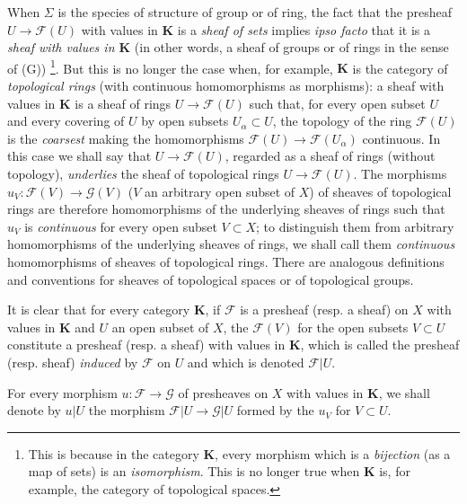 \begin{env}[3.1.4]
\label{0.3.1.4}
When $\Sigma$ is the species of structure of group or of ring, the fact that
the presheaf $U\to\mathcal{F}(U)$ with values in $\mathbf{K}$ is a
\emph{sheaf of sets} implies \emph{ipso facto} that it is a
\emph{sheaf with values in $\mathbf{K}$} (in other words, a sheaf of
groups or of rings in the sense of (G))%
\footnote{This is because in the category $\mathbf{K}$, every morphism
which is a \emph{bijection} (as a map of sets) is an
\emph{isomorphism}. This is no longer true when $\mathbf{K}$ is, for example, the
category of topological spaces.}. But this is no longer the
case when, for example, $\mathbf{K}$ is the category of \emph{topological
rings} (with continuous homomorphisms as morphisms): a
sheaf with values in $\mathbf{K}$ is a sheaf of rings
$U\to\mathcal{F}(U)$ such that, for every open subset $U$ and every covering of $U$
by open subsets $U_\alpha\subset U$, the topology of the ring $\mathcal{F}(U)$
is the \emph{coarsest} making the homomorphisms
$\mathcal{F}(U)\to\mathcal{F}(U_\alpha)$ continuous. In this case we shall say that
$U\to\mathcal{F}(U)$, regarded as a sheaf of rings (without topology),
\emph{underlies} the sheaf of topological rings
$U\to\mathcal{F}(U)$. The morphisms
$u_V:\mathcal{F}(V)\to\mathcal{G}(V)$ ($V$ an arbitrary open subset of $X$) of
sheaves of topological rings are therefore homomorphisms of the underlying sheaves
of rings such that $u_V$ is \emph{continuous} for every open subset
$V\subset X$; to distinguish them from arbitrary homomorphisms of the
underlying sheaves of rings, we shall call them \emph{continuous}
homomorphisms of sheaves of topological rings. There are analogous definitions and
conventions for sheaves of topological spaces or of topological
groups.
\end{env}


\begin{env}[3.1.5]
\label{0.3.1.5}
It is clear that for every category $\mathbf{K}$, if $\mathcal{F}$ is a
presheaf (resp. a sheaf) on $X$ with values in $\mathbf{K}$ and $U$ an
open subset of $X$, the $\mathcal{F}(V)$ for the open subsets $V\subset U$ constitute
a presheaf (resp. a sheaf) with values in $\mathbf{K}$, which is
called the presheaf (resp. sheaf) \emph{induced} by $\mathcal{F}$ on $U$ and
which is denoted $\mathcal{F}|U$.

For every morphism $u:\mathcal{F}\to\mathcal{G}$ of presheaves on $X$ with
values in $\mathbf{K}$, we shall denote by $u|U$ the morphism
$\mathcal{F}|U\to\mathcal{G}|U$ formed by the $u_V$ for $V\subset U$.
\end{env}

